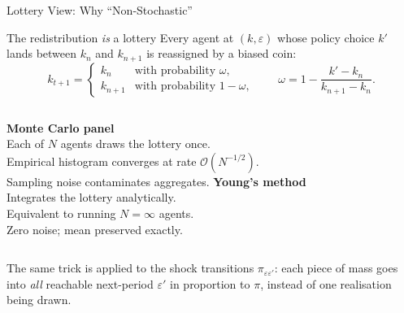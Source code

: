 \documentclass[aspectratio=169,11pt]{beamer}
\newcommand{\emphc}[1]{\textcolor{harvardcrimson}{#1}}
\begin{document}
\begin{frame}{Lottery View: Why ``Non-Stochastic''}
\small
\begin{block}{The redistribution \emph{is} a lottery}
Every agent at $(k, \varepsilon)$ whose policy choice $k'$ lands between $k_n$ and $k_{n+1}$ is reassigned by a \emphc{biased coin}:
\[
k_{t+1} = \begin{cases} k_n     & \text{with probability } \omega,\\ k_{n+1} & \text{with probability } 1-\omega,\end{cases}
\qquad \omega = 1 - \frac{k' - k_n}{k_{n+1} - k_n}.
\]
\end{block}

\begin{columns}[T]
\textbf{Monte Carlo panel}\\[2pt]
Each of $N$ agents \emphc{draws the lottery once}.\\
Empirical histogram converges at rate $\mathcal{O}(N^{-1/2})$.\\
Sampling noise contaminates aggregates.
\textbf{Young's method}\\[2pt]
\emphc{Integrates the lottery analytically.}\\
Equivalent to running $N = \infty$ agents.\\
Zero noise; mean preserved exactly.
\end{columns}

\vspace{0.2em}
{\footnotesize The same trick is applied to the shock transitions $\pi_{\varepsilon\varepsilon'}$: each piece of mass goes into \emph{all} reachable next-period $\varepsilon'$ in proportion to $\pi$, instead of one realisation being drawn.}
\end{frame}
\end{document}
